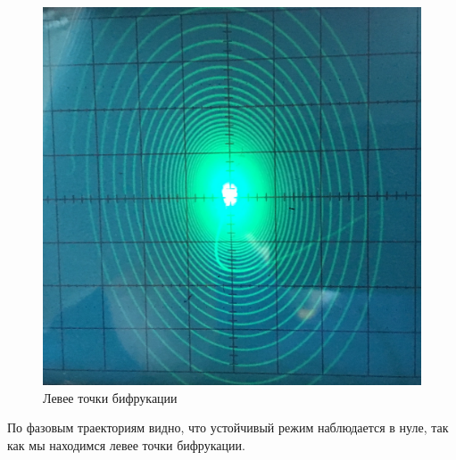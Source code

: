 \begin{figure}[h]
\begin{minipage}{0.32\linewidth}
	\end{minipage}
	\begin{minipage}{0.32\linewidth}
	\includegraphics[width=\linewidth]{photo/task1b(leftL).jpg}
	\end{minipage}
	\caption{Левее точки бифрукации}
	\label{fig3}
\end{figure}
По фазовым траекториям видно, что устойчивый режим наблюдается в нуле, так как мы находимся левее точки бифрукации.
